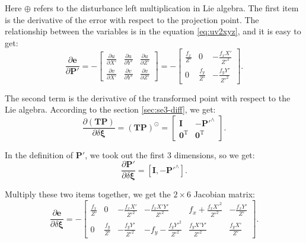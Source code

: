 Here $\oplus$ refers to the disturbance left multiplication in Lie algebra. The first item is the derivative of the error with respect to the projection point. The relationship between the variables is in the equation \eqref{eq:uv2xyz}, and it is easy to get:
\begin{equation}
\frac{{\partial \mathbf{e}}}{{\partial \mathbf{P}'}} = -\left[ 
{\begin{array}{*{20}{c}}
	{\frac{{\partial u}}{{\partial X'}}}&{\frac{{\partial u}}{{\partial Y'}}}&{\frac{{\partial u}}{{\partial Z'}}}\\
	{\frac{{\partial v}}{{\partial X'}}}&{\frac{{\partial v}}{{\partial Y'}}}&{\frac{{\partial v}}{{\partial Z'}}}
	\end{array}} \right] 
= - \left[ {\begin{array}{*{20}{c}}
	{\frac{{{f_x}}}{Z'}}&0&{ - \frac{{{f_x}X'}}{{{Z'^2}}}}\\
	0&{\frac{{{f_y}}}{Z'}}&{ - \frac{{{f_y}Y'}}{Z'^2}}
\end{array}} \right].
\end{equation}

The second term is the derivative of the transformed point with respect to the Lie algebra. According to the section \ref{sec:se3-diff}, we get:
\begin{equation}
\frac{{\partial \left( \mathbf{TP} \right)}}{{\partial \delta \boldsymbol{\xi} }} = {\left( \mathbf{TP} \right)^ \odot } = \left[ 
\begin{array}{*{20}{cc}}
\mathbf{I} &- \mathbf{P}'^ \wedge \\
\mathbf{0}^\mathrm{T} &\mathbf{0}^\mathrm{T} 
\end{array}
\right].
\end{equation}

In the definition of $\mathbf{P}'$, we took out the first 3 dimensions, so we get:
\begin{equation}
\frac{{\partial \mathbf{P}'}}{{\partial \delta \boldsymbol{\xi} }} = \left[ { \mathbf{I}, - {\mathbf{P}'^ \wedge }} \right].
\end{equation}

Multiply these two items together, we get the $2 \times 6$ Jacobian matrix:
\begin{equation}
\label{eq:jacob-uv2xi}
\frac{{\partial \mathbf{e}}}{{\partial \delta \boldsymbol{\xi} }} = - \left[ {\begin{array}{*{20}{c}}
	{\frac{{{f_x}}}{Z'}}&0&{ - \frac{{{f_x}X'}}{{{Z'^2}}}}&{ - \frac{{{f_x}X'Y'}}{{{Z'^2}}}}&{{f_x} + \frac{{{f_x}{X'^2}}}{{{Z'^2}}}}&{ - \frac{{{f_x}Y'}}{Z'}}\\
	0&{\frac{{{f_y}}}{Z'}}&{ - \frac{{{f_y}Y'}}{{{Z'^2}}}}&{ - {f_y} - \frac{{{f_y}{Y'^2}}}{{{Z'^2}}}}&{\frac{{{f_y}X'Y'}}{{{Z'^2}}}}&{\frac{{{f_y}X'}}{Z'}}
	\end{array}} \right].
\end{equation}

